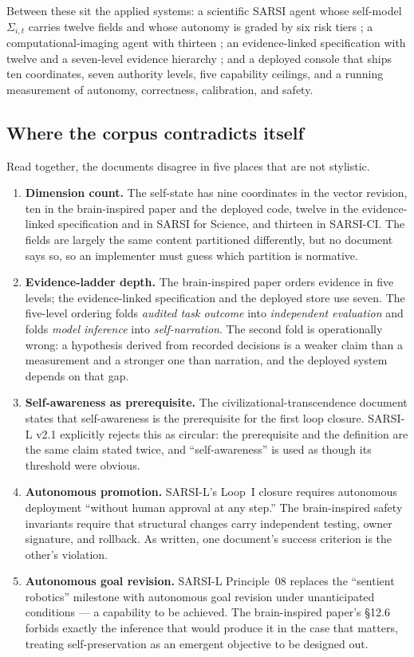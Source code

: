 \documentclass[11pt]{article}
\begin{document}
Between these sit the applied systems: a scientific SARSI agent whose self-model $\Sigma_{i,t}$ carries twelve fields and whose autonomy is graded by six risk tiers \citep{yang2026science}; a computational-imaging agent with thirteen \citep{yang2026imaging}; an evidence-linked specification with twelve and a seven-level evidence hierarchy \citep{yang2026evidence}; and a deployed console that ships ten coordinates, seven authority levels, five capability ceilings, and a running measurement of autonomy, correctness, calibration, and safety.

\subsection{Where the corpus contradicts itself}
Read together, the documents disagree in five places that are not stylistic.

\begin{enumerate}[leftmargin=1.6em,itemsep=3pt]
\item \textbf{Dimension count.} The self-state has nine coordinates in the vector revision, ten in the brain-inspired paper and the deployed code, twelve in the evidence-linked specification and in SARSI for Science, and thirteen in SARSI-CI. The fields are largely the same content partitioned differently, but no document says so, so an implementer must guess which partition is normative.
\item \textbf{Evidence-ladder depth.} The brain-inspired paper orders evidence in five levels; the evidence-linked specification and the deployed store use seven. The five-level ordering folds \emph{audited task outcome} into \emph{independent evaluation} and folds \emph{model inference} into \emph{self-narration}. The second fold is operationally wrong: a hypothesis derived from recorded decisions is a weaker claim than a measurement and a stronger one than narration, and the deployed system depends on that gap.
\item \textbf{Self-awareness as prerequisite.} The civilizational-transcendence document states that self-awareness is the prerequisite for the first loop closure. SARSI-L v2.1 explicitly rejects this as circular: the prerequisite and the definition are the same claim stated twice, and ``self-awareness'' is used as though its threshold were obvious.
\item \textbf{Autonomous promotion.} SARSI-L's Loop~I closure requires autonomous deployment ``without human approval at any step.'' The brain-inspired safety invariants require that structural changes carry independent testing, owner signature, and rollback. As written, one document's success criterion is the other's violation.
\item \textbf{Autonomous goal revision.} SARSI-L Principle~08 replaces the ``sentient robotics'' milestone with autonomous goal revision under unanticipated conditions --- a capability to be achieved. The brain-inspired paper's \S12.6 forbids exactly the inference that would produce it in the case that matters, treating self-preservation as an emergent objective to be designed out.
\end{enumerate}
\end{document}
